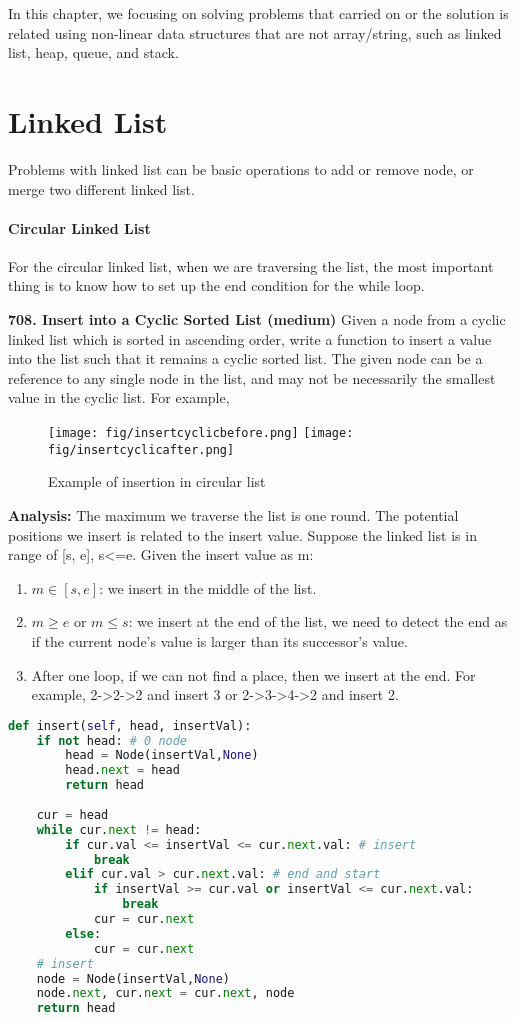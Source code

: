 \documentclass[../main.tex]{subfiles}
\begin{document}
In this chapter, we focusing on solving problems that carried on or the solution is related using non-linear data structures that are not array/string, such as linked list, heap, queue, and stack. 
\section{Linked List}
Problems with linked list can be basic operations to add or remove node, or merge two different linked list. 
\paragraph{Circular Linked List} For the circular linked list, when we are traversing the list, the most important thing is to know how to set up the end condition for the while loop. 
\begin{examples}[resume]
\item \textbf{708. Insert into a Cyclic Sorted List (medium)} Given a node from a cyclic linked list which is sorted in ascending order, write a function to insert a value into the list such that it remains a cyclic sorted list. The given node can be a reference to any single node in the list, and may not be necessarily the smallest value in the cyclic list. For example,
\begin{figure}[h!]
    \centering
    \texttt{[image: fig/insertcyclicbefore.png]}
    \texttt{[image: fig/insertcyclicafter.png]}
    \caption{Example of insertion in circular list}
    \label{fig:circular list}
\end{figure}

\textbf{Analysis:} The maximum we traverse the list is one round. The potential positions we insert is related to the insert value. Suppose the linked list is in range of [s, e], s<=e.  Given the insert value as m:
\begin{enumerate}
    \item $m\in [s, e]$: we insert in the middle of the list. 
    \item $ m \geq e$ or $ m\leq s$: we insert at the end of the list, we need to detect the end as if the current node's value is larger than its successor's value. 
    \item After one loop, if we can not find a place, then we insert at the end. For example, 2->2->2 and insert 3 or 2->3->4->2 and insert 2. 
\end{enumerate}
\begin{lstlisting}[language=Python]
def insert(self, head, insertVal):
    if not head: # 0 node
        head = Node(insertVal,None)
        head.next = head
        return head         
    
    cur = head
    while cur.next != head:
        if cur.val <= insertVal <= cur.next.val: # insert
            break
        elif cur.val > cur.next.val: # end and start
            if insertVal >= cur.val or insertVal <= cur.next.val:
                break
            cur = cur.next
        else:
            cur = cur.next
    # insert
    node = Node(insertVal,None)
    node.next, cur.next = cur.next, node
    return head
\end{lstlisting}
\end{examples}
\end{document}
